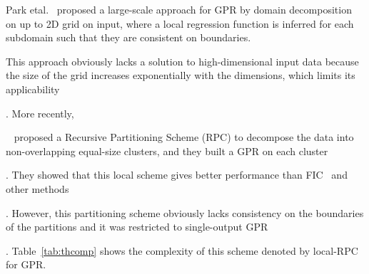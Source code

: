 Park etal.~\cite{park11} proposed a large-scale approach for  GPR by domain decomposition on up to 2D grid on input, where a local regression function is inferred for each subdomain such that they are consistent on boundaries. This approach obviously lacks a solution to high-dimensional input data because the size of the grid increases exponentially with the dimensions, which limits its applicability. More recently,~\cite{Chalupka:2013} proposed a Recursive Partitioning Scheme (RPC) to decompose the data into non-overlapping equal-size clusters, and they built a GPR on each cluster. They showed that this local scheme gives better performance  than FIC~\cite{fic06} and other methods. However, this partitioning scheme obviously lacks consistency on the boundaries of the partitions and it was restricted to single-output GPR. Table~\ref{tab:thcomp} shows the complexity of this scheme denoted by local-RPC for GPR.
 
  
\begin{comment}
Another way to implement local regression is through Mixture of Experts (MoE)  as an Ensemble method to make prediction based on computing the final output by combining outputs of local predictors called experts (see a recent study of MoE approaches \cite{tymoe12}). Examples include Bayesian committee machine (BCM~\cite{BCM00}), local probabilistic regression (LPR~\cite{LPR08}), mixture of Tree of Gaussian Processes (GPs)~\cite{TreeGPs07}, and Mixture of GPs~\cite{Rasmussen:2005}. While these approaches overcome the discontinuity problem by the combination mechanism, they suffer from intensive complexity at test time, which limits its applicability in large-scale setting\ignore{. One more computational aspect is that mixture models, as } (e.g., Tree of GPs and Mixture of GPs, involve complicated integration, which is approximated by sampling or Monte Carlo simulation, that has a big computation cost).


, a common restriction in the prior work
\end{comment}






